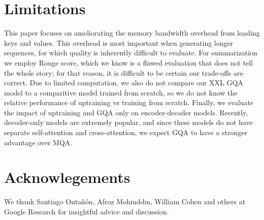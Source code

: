 \section*{Limitations}

This paper focuses on ameliorating the memory bandwidth overhead from loading keys and values. This overhead is most important when generating longer sequences, for which quality is inherently difficult to evaluate. For summarization we employ Rouge score, which we know is a flawed evaluation that does not tell the whole story; for that reason, it is difficult to be certain our trade-offs are correct. Due to limited computation, we also do not compare our XXL \textsc{GQA} model to a comparitive model trained from scratch, so we do not know the relative performance of uptraining vs training from scratch. Finally, we evaluate the impact of uptraining and \textsc{GQA} only on encoder-decoder models. Recently, decoder-only models are extremely popular, and since these models do not have separate self-attention and cross-attention, we expect \textsc{GQA} to have a stronger advantage over \textsc{MQA}.

\section*{Acknowlegements}
We thank Santiago Onta\~{n}\'{o}n, Afroz Mohiuddin, William Cohen and others at Google Research for insightful advice and discussion. 


